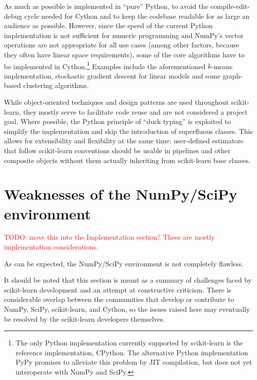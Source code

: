 \documentclass{llncs}
\begin{document}
As much as possible is implemented in ``pure'' Python,
to avoid the compile-edit-debug cycle needed for Cython
and to keep the codebase readable for as large an audience as possible.
However, since the speed of the current Python implementation
is not sufficient for numeric programming
and NumPy's vector operations are not appropriate for all use cases
(among other factors, because they often have linear space requirements),
some of the core algorithms have to be implemented in Cython.\footnote{
  The only Python implementation currently supported by scikit-learn
  is the reference implementation, CPython.
  The alternative Python implementation PyPy \citep{bolz2009tracing}
  promises to alleviate this problem by JIT compilation,
  but does not yet interoperate with NumPy and SciPy.
}
Examples include the aforementioned $k$-means implementation,
stochastic gradient descent for linear models
and some graph-based clustering algorithms.

While object-oriented techniques and design patterns
are used throughout scikit-learn,
they mostly serve to facilitate code reuse and are not considered a project goal.
Where possible, the Python principle of ``duck typing'' is exploited
to simplify the implementation and skip the introduction of superfluous classes.
This allows for extensibility and flexibility at the same time:
user-defined estimators that follow scikit-learn conventions
should be usable in pipelines and other composite objects
without them actually inheriting from scikit-learn base classes.

\section{Weaknesses of the NumPy/SciPy environment}

\label{sec:weaknesses}

\textcolor{red}{TODO: move this into the Implementation section? These are mostly implementation considerations.}

As can be expected, the NumPy/SciPy environment is not completely flawless.

It should be noted that this section is meant
as a summary of challenges faced by scikit-learn development
and an attempt at constructive criticism.
There is considerable overlap between the communities
that develop or contribute to NumPy, SciPy, scikit-learn, and Cython,
so the issues raised here may eventually be resolved
by the scikit-learn developers themselves.
\end{document}
